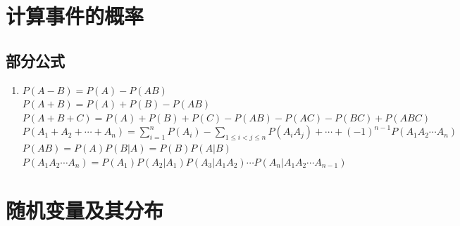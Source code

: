 \documentclass[12pt,a4paper,UTF8]{book}
\begin{document}
\section{计算事件的概率}
\subsection{部分公式}
\begin{enumerate}[]
\item $P\left(A-B\right)=P\left(A\right)-P\left(AB\right)$\\
$P\left(A+B\right)=P\left(A\right)+P\left(B\right)-P\left(AB\right)$\\
$P\left(A+B+C\right)=P\left(A\right)+P\left(B\right)+P\left(C\right)-P\left(AB\right)-P\left(AC\right)-P\left(BC\right)+P\left(ABC\right)$\\
$P\left(A_1+A_2+\cdots+A_n\right)=\sum\limits_{i=1}^nP\left(A_i\right)-\sum\limits_{1\leq i<j\leq n}P\left(A_iA_j\right)+\cdots+\left(-1\right)^{n-1}P\left(A_1A_2\cdots A_n\right)$\\
$P\left(AB\right)=P\left(A\right)P\left(B|A\right)=P\left(B\right)P\left(A|B\right)$\\
$P\left(A_1A_2\cdots A_n\right)=P\left(A_1\right)P\left(A_2|A_1\right)P\left(A_3|A_1A_2\right)\cdots P\left(A_n|A_1A_2\cdots A_{n-1}\right)$\\
\end{enumerate}


\section{随机变量及其分布}
\end{document}
